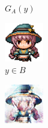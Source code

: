 \documentclass[twocolumn,11pt]{ctexart}
\begin{document}
\begin{figure}[htb]
\begin{subfigure}[b]{0.23\linewidth}
        \caption{$G_A(y)$}
      \end{subfigure}
      \begin{subfigure}[b]{0.23\linewidth}
        \includegraphics[width=\linewidth]{exp2_epoch060_real_B.png}
        \caption{$y \in B$}
      \end{subfigure}
      \begin{subfigure}[b]{0.23\linewidth}
        \includegraphics[width=\linewidth]{exp2_epoch060_fake_A.png}

\end{subfigure}
\end{figure}
\end{document}
